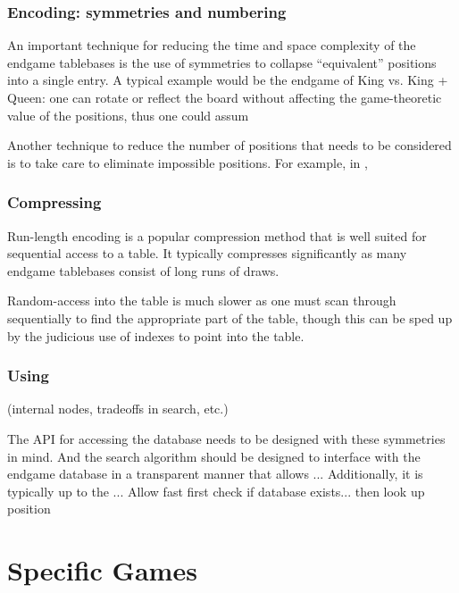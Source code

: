 \documentclass[10pt,dvipdfmx]{report}
\newcommand{\g}[1]{{\sc{#1}}\index{{\sc{#1}}}}
\begin{document}
\section{Encoding: symmetries and numbering}

An important technique for reducing the time and space complexity of the endgame tablebases
is the use of symmetries to collapse ``equivalent'' positions into a single entry.  A typical example
would be the \g{chess} endgame of King vs. King + Queen: one can rotate or reflect the board without
affecting the game-theoretic value of the positions, thus one could assum

Another technique to reduce the number of positions that needs to be considered is to take care to
eliminate impossible positions.  For example, in \g{chess}, 

\section{Compressing}

Run-length encoding is a popular compression method that is well suited for sequential access to
a table.  It typically compresses significantly as many endgame tablebases consist of long runs
of draws.

Random-access into the table is much slower as one must scan through sequentially to find the appropriate
part of the table, though this can be sped up by the judicious use of indexes to point into the table.

\section{Using}
(internal nodes, tradeoffs in search, etc.)

The API for accessing the database needs to be designed with these symmetries in mind.
And the search algorithm should be designed to interface with the endgame database in a transparent
manner that allows ...
Additionally, it is typically up to the ...
Allow fast first check if database exists...  then look up position


\part{Specific Games}
\end{document}
